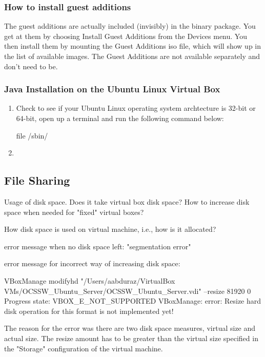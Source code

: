 \documentclass[11pt, oneside]{article}   	%
\begin{document}
\subsubsection{How to install guest additions}
The guest additions are actually included (invisibly) in the binary package. You get at them by choosing Install Guest Additions from the Devices menu.
You then install them by mounting the Guest Additions iso file,
which will show up in the list of available images. The Guest Additions are not available separately and don't need to be.

\subsubsection{Java Installation on the Ubuntu Linux Virtual Box}

\begin{enumerate}
\item Check to see if your Ubuntu Linux operating system archtecture is 32-bit or 64-bit, open up a terminal and run the following command below:
     \begin{code}
             file /sbin/
      \end{code}
\item
\end{enumerate}
\subsection{File Sharing}

Usage of disk space. Does it take virtual box disk space? How to increase disk space when needed for "fixed" virtual boxes?

How disk space is used on virtual machine, i.e., how is it allocated?

error message when no disk space left:
"segmentation error"

error message for incorrect way of increasing disk space:

VBoxManage modifyhd "/Users/aabduraz/VirtualBox VMs/OCSSW_Ubuntu_Server/OCSSW_Ubuntu_Server.vdi" --resize 81920
0%
Progress state: VBOX_E_NOT_SUPPORTED
VBoxManage: error: Resize hard disk operation for this format is not implemented yet!

The reason for the error was there are two disk space measures, virtual size and actual size. The resize amount has to be greater than the virtual size specified in the "Storage" configuration of the virtual machine.
\end{document}
